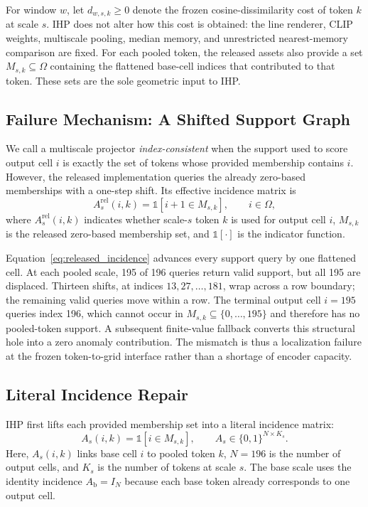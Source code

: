 For window $w$, let $d_{w,s,k}\geq0$ denote the frozen cosine-dissimilarity
cost of token $k$ at scale $s$. IHP does not alter how this cost is obtained:
the line renderer, CLIP weights, multiscale pooling, median memory, and
unrestricted nearest-memory comparison are fixed. For each pooled token, the
released assets also provide a set
$M_{s,k}\subseteq\Omega$ containing the flattened base-cell indices that
contributed to that token. These sets are the sole geometric input to IHP.

\subsection{Failure Mechanism: A Shifted Support Graph}
\label{sec:coordinate_failure}

We call a multiscale projector \emph{index-consistent} when the support used
to score output cell $i$ is exactly the set of tokens whose provided
membership contains $i$. However, the released implementation queries the
already zero-based memberships with a one-step shift. Its effective incidence
matrix is
\begin{equation}
 A^{\mathrm{rel}}_s(i,k)
 =\mathbb{1}\!\left[i+1\in M_{s,k}\right],
 \qquad i\in\Omega ,
 \label{eq:released_incidence}
\end{equation}
where $A^{\mathrm{rel}}_s(i,k)$ indicates whether scale-$s$ token $k$ is used
for output cell $i$, $M_{s,k}$ is the released zero-based membership set, and
$\mathbb{1}[\cdot]$ is the indicator function.

Equation~\eqref{eq:released_incidence} advances every support query by one
flattened cell. At each pooled scale, 195 of 196 queries return valid support,
but all 195 are displaced. Thirteen shifts, at indices
$13,27,\ldots,181$, wrap across a row boundary; the remaining valid queries
move within a row. The terminal output cell $i=195$ queries index 196, which
cannot occur in $M_{s,k}\subseteq\{0,\ldots,195\}$ and therefore has no
pooled-token support. A subsequent finite-value fallback converts this
structural hole into a zero anomaly contribution. The mismatch is thus a
localization failure at the frozen token-to-grid interface rather than a
shortage of encoder capacity.

\subsection{Literal Incidence Repair}
\label{sec:literal_lifting}

IHP first lifts each provided membership set into a literal incidence matrix:
\begin{equation}
 A_s(i,k)=\mathbb{1}\!\left[i\in M_{s,k}\right],
 \qquad A_s\in\{0,1\}^{N\times K_s}.
 \label{eq:literal_incidence}
\end{equation}
Here, $A_s(i,k)$ links base cell $i$ to pooled token $k$, $N=196$ is the
number of output cells, and $K_s$ is the number of tokens at scale $s$. The
base scale uses the identity incidence $A_{\mathrm{b}}=I_N$ because each base
token already corresponds to one output cell.

